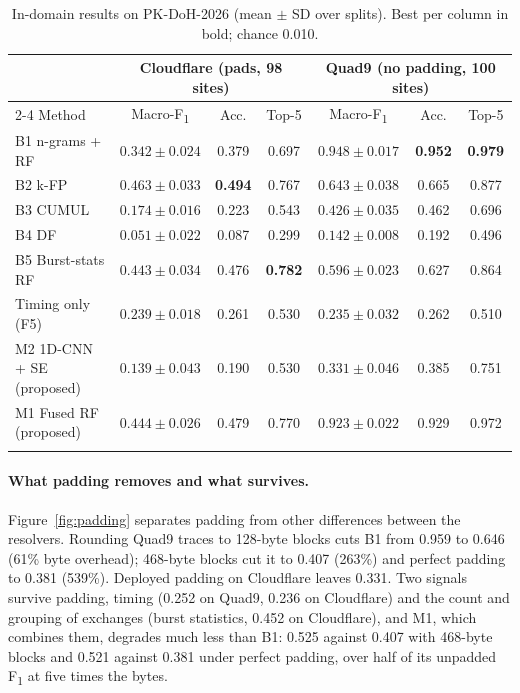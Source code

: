 \documentclass[pdflatex,sn-mathphys-num]{sn-jnl}
\newcommand{\Fone}{F\textsubscript{1}}
\begin{document}
\begin{table}[t]
\caption{In-domain results on PK-DoH-2026 (mean $\pm$ SD over splits). Best per column in bold; chance 0.010.}\label{tab:e2}
\scriptsize\setlength{\tabcolsep}{2pt}
\begin{tabular*}{\textwidth}{@{\extracolsep\fill}lcccccc@{}}
\toprule
& \multicolumn{3}{c}{Cloudflare (pads, 98 sites)} & \multicolumn{3}{c}{Quad9 (no padding, 100 sites)} \\
\cmidrule{2-4}\cmidrule{5-7}
Method & Macro-\Fone{} & Acc. & Top-5 & Macro-\Fone{} & Acc. & Top-5 \\
\midrule
B1 n-grams + RF~\cite{siby2020} & $0.342\pm0.024$ & 0.379 & 0.697 & $\mathbf{0.948\pm0.017}$ & \textbf{0.952} & \textbf{0.979} \\
B2 k-FP~\cite{hayes2016kfp} & $\mathbf{0.463\pm0.033}$ & \textbf{0.494} & 0.767 & $0.643\pm0.038$ & 0.665 & 0.877 \\
B3 CUMUL~\cite{panchenko2016cumul} & $0.174\pm0.016$ & 0.223 & 0.543 & $0.426\pm0.035$ & 0.462 & 0.696 \\
B4 DF~\cite{sirinam2018df} & $0.051\pm0.022$ & 0.087 & 0.299 & $0.142\pm0.008$ & 0.192 & 0.496 \\
B5 Burst-stats RF~\cite{mouregarrido2026} & $0.443\pm0.034$ & 0.476 & \textbf{0.782} & $0.596\pm0.023$ & 0.627 & 0.864 \\
Timing only (F5) & $0.239\pm0.018$ & 0.261 & 0.530 & $0.235\pm0.032$ & 0.262 & 0.510 \\
M2 1D-CNN + SE (proposed) & $0.139\pm0.043$ & 0.190 & 0.530 & $0.331\pm0.046$ & 0.385 & 0.751 \\
M1 Fused RF (proposed) & $0.444\pm0.026$ & 0.479 & 0.770 & $0.923\pm0.022$ & 0.929 & 0.972 \\
\botrule
\end{tabular*}
\end{table}

\paragraph{What padding removes and what survives.} Figure~\ref{fig:padding} separates padding from other differences between the resolvers. Rounding Quad9 traces to 128-byte blocks cuts B1 from 0.959 to 0.646 (61\% byte overhead); 468-byte blocks cut it to 0.407 (263\%) and perfect padding to 0.381 (539\%). Deployed padding on Cloudflare leaves 0.331. Two signals survive padding, timing (0.252 on Quad9, 0.236 on Cloudflare) and the count and grouping of exchanges (burst statistics, 0.452 on Cloudflare), and M1, which combines them, degrades much less than B1: 0.525 against 0.407 with 468-byte blocks and 0.521 against 0.381 under perfect padding, over half of its unpadded \Fone{} at five times the bytes.
\end{document}

